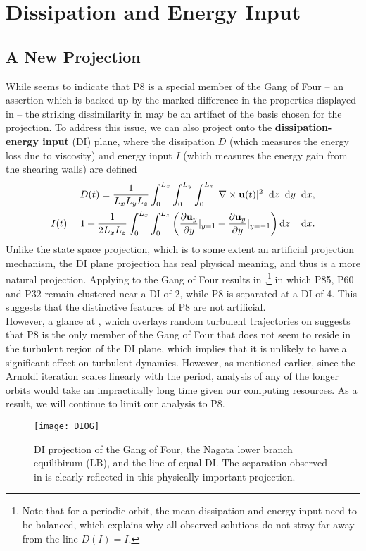 \section{Dissipation and Energy Input} \label{sec:DI}
  
\subsection{A New Projection}
While  seems to indicate that P8 is a special member of the Gang of Four -- an assertion which is backed up by the marked difference in the properties displayed in  -- the striking dissimilarity in  may be an artifact of the basis chosen for the projection. To address this issue, we can also project onto the {\bf dissipation-energy input} (DI) plane, where the dissipation $D$ (which measures the energy loss due to viscosity) and energy input $I$ (which measures the energy gain from the shearing walls) are defined
\begin{align}
D(t) = \frac{1}{L_xL_yL_z}\int{0}{L_x}{\int{0}{L_y}{\int{0}{L_z}{|\nabla\times\Vector{u}(t)|^2}{\textrm{d}z}}{\textrm{d}y}}{\textrm{d}x},\label{eq:diss}\\
I(t)  = 1 + \frac{1}{2L_xL_z}\int{0}{L_x}{\int{0}{L_z}{\paren{\pder{1}{
\Vector{u}_{y}}{y} |_{y=1}+\pder{1}{\Vector{u}_{y}}{y} |_{y=-1}}{\textrm{d}z}}}{\textrm{d}x}.\label{eq:einp}
\end{align} 
Unlike the state space projection, which is to some extent an artificial projection mechanism, the DI plane projection has real physical meaning, and thus is a more natural projection. Applying  to the Gang of Four results in ,\footnote{Note that for a periodic orbit, the mean dissipation and energy input need to be balanced, which explains why all observed solutions do not stray far away from the line $D(I) = I$.} in which P85, P60 and P32 remain clustered near a DI of 2, while P8 is separated at a DI of 4. This suggests that the distinctive features of P8 are not artificial.\\

 However, a glance at , which overlays random turbulent trajectories on  suggests that P8 is the only member of the Gang of Four that does not seem to reside in the turbulent region of the DI plane, which implies that it is unlikely to have a significant effect on turbulent dynamics. However, as mentioned earlier, since the Arnoldi iteration scales linearly with the period, analysis of any of the longer orbits would take an impractically long time given our computing resources. As a result, we will continue to limit our analysis to P8.   
\begin{figure}[h]
\texttt{[image: DIOG]}
\caption{DI projection of the Gang of Four, the Nagata lower branch equilibirum (LB), and the line of equal DI. The separation observed in  is clearly reflected in this physically important projection.}\label{fig:DIGOF}
\end{figure}


